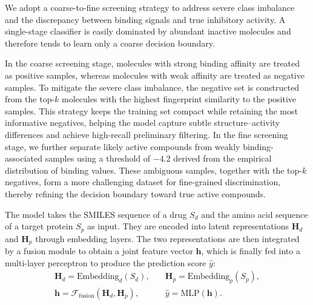 \documentclass[preprint,12pt]{elsarticle}
\theoremstyle{plain}
\theoremstyle{definition}
\theoremstyle{remark}
\begin{document}
We adopt a coarse-to-fine screening strategy to address severe class imbalance and the discrepancy between binding signals and true inhibitory activity. A single-stage classifier is easily dominated by abundant inactive molecules and therefore tends to learn only a coarse decision boundary.

In the coarse screening stage, molecules with strong binding affinity are treated as positive samples, whereas molecules with weak affinity are treated as negative samples. To mitigate the severe class imbalance, the negative set is constructed from the top-$k$ molecules with the highest fingerprint similarity to the positive samples. This strategy keeps the training set compact while retaining the most informative negatives, helping the model capture subtle structure--activity differences and achieve high-recall preliminary filtering. In the fine screening stage, we further separate likely active compounds from weakly binding-associated samples using a threshold of $-4.2$ derived from the empirical distribution of binding values. These ambiguous samples, together with the top-$k$ negatives, form a more challenging dataset for fine-grained discrimination, thereby refining the decision boundary toward true active compounds.


The model takes the SMILES sequence of a drug $S_d$ and the amino acid sequence of a target protein $S_p$ as input. They are encoded into latent representations $\mathbf{H}_d$ and $\mathbf{H}_p$ through embedding layers. The two representations are then integrated by a fusion module to obtain a joint feature vector $\mathbf{h}$, which is finally fed into a multi-layer perceptron to produce the prediction score $\hat{y}$:
\begin{equation}
\begin{aligned}
\mathbf{H}_d = \mathrm{Embedding}_d(S_d),& \quad
\mathbf{H}_p = \mathrm{Embedding}_p(S_p), \\
\mathbf{h} = \mathcal{F}_{\mathrm{fusion}}(\mathbf{H}_d, \mathbf{H}_p),& \quad \hat{y} = \mathrm{MLP}(\mathbf{h}).
\end{aligned}
\end{equation}

\end{document}
